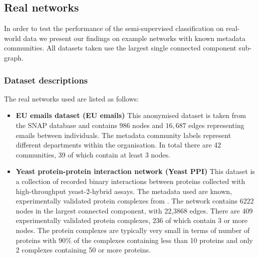 \documentclass[manuscript, proceedings]{acmart}
\begin{document}
\subsection{Real networks}
In order to test the performance of the semi-supervised classification on real-world data we present our findings on example networks with known metadata communities.
All datasets taken use the largest single connected component sub-graph.

\subsubsection{Dataset descriptions}
\label{sec:real_network_descs}
The real networks used are listed as follows:
\begin{itemize}
 \item \textbf{EU emails dataset (EU emails)} This anonymised dataset is taken from the SNAP database \cite{snap} and contains $986$ nodes and $16,687$ edges representing emails between individuals.
 The metadata community labels represent different departments within the organisation.
 In total there are 42 communities, 39 of which contain at least 3 nodes.
 
 \item \textbf{Yeast protein-protein interaction network (Yeast PPI)} \cite{yeast_ppi}
 This dataset is a collection of recorded binary interactions between proteins collected with high-throughput yeast-2-hybrid assays.
 The metadata used are known, experimentally validated protein complexes from \cite{yeast_ppi_complexes}.
 The network contains 6222 nodes in the largest connected component, with 22,3868 edges.
 There are 409 experimentally validated protein complexes, 236 of which contain 3 or more nodes.
 The protein complexes are typically very small in terms of number of proteins with  90\% of the complexes containing less than 10 proteins and only 2 complexes containing 50 or more proteins.
 
\end{itemize}
\end{document}
